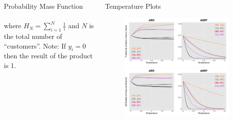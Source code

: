\documentclass[serif,mathserif,final]{beamer}
\def\suml#1#2#3{\sum\limits_{#1=#2}^{#3}}
\def\ds{\displaystyle}
\begin{document}
\begin{frame}{}
\begin{columns}[t]
\begin{column}{0.4\linewidth}
\begin{block}{Probability Mass Function}
\[\begin{array}{rrcl}
        \end{array}  
        \]

        where $H_N = \suml{i}{1}{N} \ds\frac{1}{i}$ and $N$ is the total
        number of ``customers''.  Note: If $y_i=0$ then the result of the product is 1.
      \end{block}

    \end{column}%


    \begin{column}{0.32\linewidth}

      \begin{block}{Temperature Plots}
        \begin{figure}[htb]
          \centering
          \href{http://luiarthur.github.io/posts/ibp/may/26}{\includegraphics[width=.99\columnwidth,trim={0 0.7cm 0 0.3cm},clip]{temperatureArrest}}
          \\
          \includegraphics[width=.99\columnwidth,trim={0 0.7cm 0 0.3cm},clip]{sharedTemper}
        \end{figure}
      \end{block}


\end{column}
\end{columns}
\end{frame}
\end{document}
